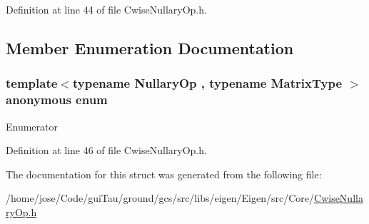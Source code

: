 Definition at line 44 of file Cwise\-Nullary\-Op.\-h.



\subsection{Member Enumeration Documentation}
\hypertarget{structei__traits_3_01_cwise_nullary_op_3_01_nullary_op_00_01_matrix_type_01_4_01_4_a20518924df9312b03eff03a565406651}{\subsubsection[{anonymous enum}]{\setlength{\rightskip}{0pt plus 5cm}template$<$typename Nullary\-Op , typename Matrix\-Type $>$ anonymous enum}}\label{structei__traits_3_01_cwise_nullary_op_3_01_nullary_op_00_01_matrix_type_01_4_01_4_a20518924df9312b03eff03a565406651}
\begin{Desc}
\item[Enumerator]\par
\begin{description}
\item[{\em 
\hypertarget{structei__traits_3_01_cwise_nullary_op_3_01_nullary_op_00_01_matrix_type_01_4_01_4_a20518924df9312b03eff03a565406651af7e7c5514c0e2f59e64345a3e6cc0a21}{Flags}\label{structei__traits_3_01_cwise_nullary_op_3_01_nullary_op_00_01_matrix_type_01_4_01_4_a20518924df9312b03eff03a565406651af7e7c5514c0e2f59e64345a3e6cc0a21}
}]\item[{\em 
\hypertarget{structei__traits_3_01_cwise_nullary_op_3_01_nullary_op_00_01_matrix_type_01_4_01_4_a20518924df9312b03eff03a565406651a66bda3a0427cd1c346364b16cc76d73f}{Coeff\-Read\-Cost}\label{structei__traits_3_01_cwise_nullary_op_3_01_nullary_op_00_01_matrix_type_01_4_01_4_a20518924df9312b03eff03a565406651a66bda3a0427cd1c346364b16cc76d73f}
}]\end{description}
\end{Desc}


Definition at line 46 of file Cwise\-Nullary\-Op.\-h.



The documentation for this struct was generated from the following file\-:\begin{DoxyCompactItemize}
\item 
/home/jose/\-Code/gui\-Tau/ground/gcs/src/libs/eigen/\-Eigen/src/\-Core/\hyperlink{_cwise_nullary_op_8h}{Cwise\-Nullary\-Op.\-h}\end{DoxyCompactItemize}
